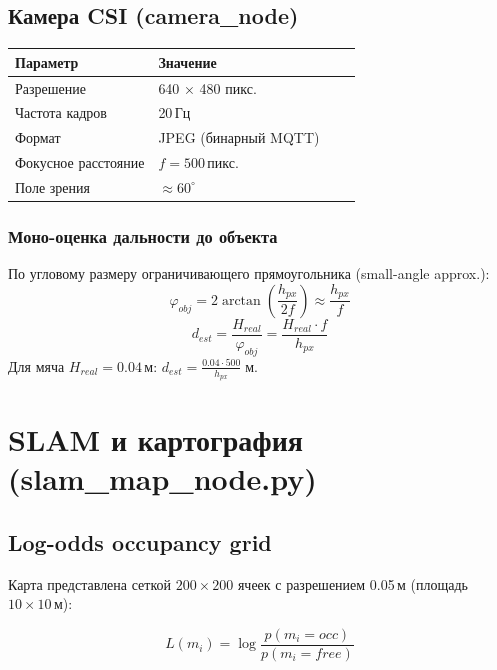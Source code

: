 \documentclass[12pt, a4paper]{article}
\begin{document}
\subsection{Камера CSI (camera\_node)}

\begin{center}
\begin{tabular}{llll}
\toprule
\textbf{Параметр} & \textbf{Значение} \\
\midrule
Разрешение     & 640 × 480 пикс. \\
Частота кадров & 20\,Гц \\
Формат         & JPEG (бинарный MQTT) \\
Фокусное расстояние & $f = 500$\,пикс. \\
Поле зрения    & $\approx 60^\circ$ \\
\bottomrule
\end{tabular}
\end{center}

\subsubsection{Моно-оценка дальности до объекта}
По угловому размеру ограничивающего прямоугольника (small-angle approx.):
\begin{equation}
  \varphi_{obj} = 2\arctan\!\left(\frac{h_{px}}{2f}\right) \approx \frac{h_{px}}{f}
\end{equation}
\begin{equation}
  d_{est} = \frac{H_{real}}{\varphi_{obj}} = \frac{H_{real} \cdot f}{h_{px}}
\end{equation}
Для мяча $H_{real} = 0.04$\,м: $d_{est} = \frac{0.04 \cdot 500}{h_{px}}\;\text{м}$.

\newpage
\section{SLAM и картография (slam\_map\_node.py)}
\label{sec:slam}

\subsection{Log-odds occupancy grid}

Карта представлена сеткой $200\times200$ ячеек с разрешением 0.05\,м (площадь $10\times10$\,м):

\begin{equation}
  L(m_i) = \log\frac{p(m_i = occ)}{p(m_i = free)}
\end{equation}
\end{document}
